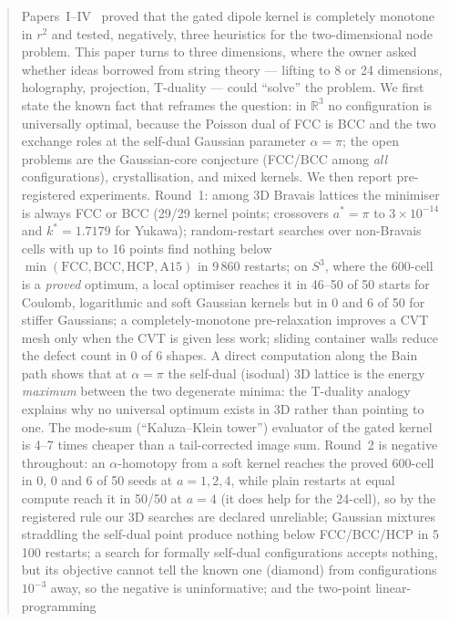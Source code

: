 \documentclass[11pt,a4paper]{article}
\begin{document}
\begin{abstract}\small\noindent
Papers~I--IV~\cite{CallensI,CallensII,CallensIII,CallensIV} proved that the gated dipole kernel is completely monotone in $r^2$ and
tested, negatively, three heuristics for the two-dimensional node problem. This paper turns to three dimensions, where the owner
asked whether ideas borrowed from string theory --- lifting to 8 or 24 dimensions, holography, projection, T-duality --- could
``solve'' the problem. We first state the known fact that reframes the question: in $\mathbb R^3$ no configuration is universally
optimal, because the Poisson dual of FCC is BCC and the two exchange roles at the self-dual Gaussian parameter $\alpha=\pi$; the
open problems are the Gaussian-core conjecture (FCC/BCC among \emph{all} configurations), crystallisation, and mixed kernels.
We then report pre-registered experiments. Round~1: among 3D Bravais lattices the minimiser is always FCC or BCC (29/29 kernel
points; crossovers $a^*=\pi$ to $3\times10^{-14}$ and $k^*=1.7179$ for Yukawa); random-restart searches over non-Bravais cells with
up to 16 points find nothing below $\min(\mathrm{FCC},\mathrm{BCC},\mathrm{HCP},\mathrm{A15})$ in 9\,860 restarts; on $S^3$, where the
600-cell is a \emph{proved} optimum, a local optimiser reaches it in 46--50 of 50 starts for Coulomb, logarithmic and soft Gaussian
kernels but in 0 and 6 of 50 for stiffer Gaussians; a completely-monotone pre-relaxation improves a CVT mesh only when the CVT is
given less work; sliding container walls reduce the defect count in 0 of 6 shapes. A direct computation along the Bain path shows
that at $\alpha=\pi$ the self-dual (isodual) 3D lattice is the energy \emph{maximum} between the two degenerate minima: the
T-duality analogy explains why no universal optimum exists in 3D rather than pointing to one. The mode-sum (``Kaluza--Klein tower'')
evaluator of the gated kernel is 4--7 times cheaper than a tail-corrected image sum. Round~2 is negative throughout: an
$\alpha$-homotopy from a soft kernel reaches the proved 600-cell in 0, 0 and 6 of 50 seeds at $a=1,2,4$, while plain restarts at equal compute reach it in 50/50 at $a=4$ (it does help for the 24-cell), so by the
registered rule our 3D searches are declared unreliable; Gaussian mixtures straddling the self-dual point produce nothing below
FCC/BCC/HCP in 5\,100 restarts; a search for formally self-dual configurations accepts nothing, but its objective cannot tell the
known one (diamond) from configurations $10^{-3}$ away, so the negative is uninformative; and the two-point linear-programming

\end{abstract}
\end{document}
